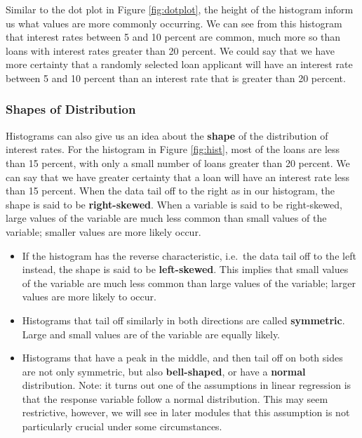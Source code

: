 \documentclass[
]{book}
\begin{document}
Similar to the dot plot in Figure \ref{fig:dotplot}, the height of the histogram inform us what values are more commonly occurring. We can see from this histogram that interest rates between 5 and 10 percent are common, much more so than loans with interest rates greater than 20 percent. We could say that we have more certainty that a randomly selected loan applicant will have an interest rate between 5 and 10 percent than an interest rate that is greater than 20 percent.

\hypertarget{shapes-of-distribution}{%
\subsubsection{Shapes of Distribution}\label{shapes-of-distribution}}

Histograms can also give us an idea about the \textbf{shape} of the distribution of interest rates. For the histogram in Figure \ref{fig:hist}, most of the loans are less than 15 percent, with only a small number of loans greater than 20 percent. We can say that we have greater certainty that a loan will have an interest rate less than 15 percent. When the data tail off to the right as in our histogram, the shape is said to be \textbf{right-skewed}. When a variable is said to be right-skewed, large values of the variable are much less common than small values of the variable; smaller values are more likely occur.

\begin{itemize}
\item
  If the histogram has the reverse characteristic, i.e.~the data tail off to the left instead, the shape is said to be \textbf{left-skewed}. This implies that small values of the variable are much less common than large values of the variable; larger values are more likely to occur.
\item
  Histograms that tail off similarly in both directions are called \textbf{symmetric}. Large and small values are of the variable are equally likely.
\item
  Histograms that have a peak in the middle, and then tail off on both sides are not only symmetric, but also \textbf{bell-shaped}, or have a \textbf{normal} distribution. Note: it turns out one of the assumptions in linear regression is that the response variable follow a normal distribution. This may seem restrictive, however, we will see in later modules that this assumption is not particularly crucial under some circumstances.
\end{itemize}
\end{document}
